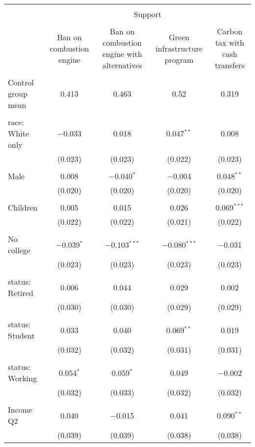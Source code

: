 
\begin{tabular}{@{\extracolsep{5pt}}lcccc} 
\\[-1.8ex]\hline 
\hline \\[-1.8ex] 
 & \multicolumn{4}{c}{Support} \\ 
\cline{2-5} 
\\[-1.8ex] & Ban on combustion engine & Ban on combustion engine with alternatives & Green infrastructure program & Carbon tax with cash transfers \\ 
\hline \\[-1.8ex] 
 Control group mean & 0.413 & 0.463 & 0.52 & 0.319  \\ \hline \\[-1.8ex] race: White only & $-$0.033 & 0.018 & 0.047$^{**}$ & 0.008 \\ 
  & (0.023) & (0.023) & (0.022) & (0.023) \\ 
  & & & & \\ 
 Male & 0.008 & $-$0.040$^{*}$ & $-$0.004 & 0.048$^{**}$ \\ 
  & (0.020) & (0.020) & (0.020) & (0.020) \\ 
  & & & & \\ 
 Children & 0.005 & 0.015 & 0.026 & 0.069$^{***}$ \\ 
  & (0.022) & (0.022) & (0.021) & (0.022) \\ 
  & & & & \\ 
 No college & $-$0.039$^{*}$ & $-$0.103$^{***}$ & $-$0.080$^{***}$ & $-$0.031 \\ 
  & (0.023) & (0.023) & (0.023) & (0.023) \\ 
  & & & & \\ 
 status: Retired & 0.006 & 0.044 & 0.029 & 0.002 \\ 
  & (0.030) & (0.030) & (0.029) & (0.029) \\ 
  & & & & \\ 
 status: Student & 0.033 & 0.040 & 0.069$^{**}$ & 0.019 \\ 
  & (0.032) & (0.032) & (0.031) & (0.031) \\ 
  & & & & \\ 
 status: Working & 0.054$^{*}$ & 0.059$^{*}$ & 0.049 & $-$0.002 \\ 
  & (0.032) & (0.033) & (0.032) & (0.032) \\ 
  & & & & \\ 
 Income Q2 & 0.040 & $-$0.015 & 0.041 & 0.090$^{**}$ \\ 
  & (0.039) & (0.039) & (0.038) & (0.038) \\ 

\end{tabular}
